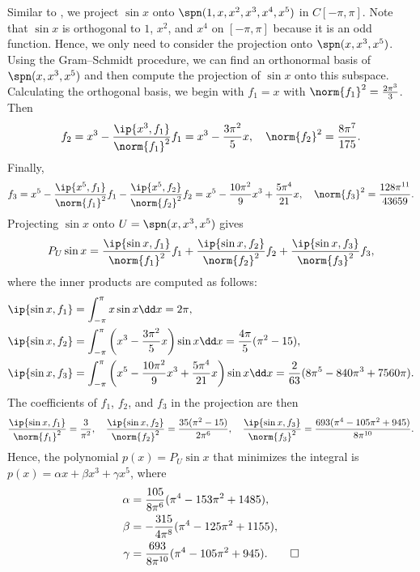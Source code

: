 \begin{sol}
    Similar to , we project $\sin x$ onto $\spn(1, x, x^2, x^3, x^4, x^5)$ in $C[-\pi, \pi]$.
    Note that $\sin x$ is orthogonal to $1$, $x^2$, and $x^4$ on $[-\pi, \pi]$ because it is an odd function.
    Hence, we only need to consider the projection onto $\spn(x, x^3, x^5)$.
    Using the Gram--Schmidt procedure, we can find an orthonormal basis of $\spn(x, x^3, x^5)$ and then compute the projection of $\sin x$ onto this subspace.
    Calculating the orthogonal basis, we begin with $f_1 = x$ with $\norm{f_1}^2 = \frac{2\pi^3}{3}$.
    Then
    \[
        f_2 = x^3 - \frac{\ip{x^3, f_1}}{\norm{f_1}^2} f_1 = x^3 - \frac{3\pi^2}{5}x, \quad \norm{f_2}^2 = \frac{8\pi^7}{175}.
    \]
    Finally,
    \[
        f_3 = x^5 - \frac{\ip{x^5, f_1}}{\norm{f_1}^2} f_1 - \frac{\ip{x^5, f_2}}{\norm{f_2}^2} f_2 = x^5 - \frac{10\pi^2}{9}x^3 + \frac{5\pi^4}{21}x, \quad \norm{f_3}^2 = \frac{128\pi^{11}}{43659}.
    \]
    Projecting $\sin x$ onto $U = \spn(x, x^3, x^5)$ gives
    \[
        P_U \sin x = \frac{\ip{\sin x, f_1}}{\norm{f_1}^2} f_1 + \frac{\ip{\sin x, f_2}}{\norm{f_2}^2} f_2 + \frac{\ip{\sin x, f_3}}{\norm{f_3}^2} f_3,
    \]
    where the inner products are computed as follows:
    \begin{align*}
        \ip{\sin x, f_1} &= \int_{-\pi}^{\pi} x \sin x \dd x = 2\pi, \\
        \ip{\sin x, f_2} &= \int_{-\pi}^{\pi} \left(x^3 - \frac{3\pi^2}{5}x\right) \sin x \dd x = \frac{4\pi}{5}(\pi^2 - 15), \\
        \ip{\sin x, f_3} &= \int_{-\pi}^{\pi} \left(x^5 - \frac{10\pi^2}{9}x^3 + \frac{5\pi^4}{21}x\right) \sin x \dd x = \frac{2}{63}(8\pi^5 - 840\pi^3 + 7560\pi).
    \end{align*}
    The coefficients of $f_1$, $f_2$, and $f_3$ in the projection are then
    \[
        \frac{\ip{\sin x, f_1}}{\norm{f_1}^2} = \frac{3}{\pi^2}, \quad
        \frac{\ip{\sin x, f_2}}{\norm{f_2}^2} = \frac{35(\pi^2 - 15)}{2\pi^6}, \quad
        \frac{\ip{\sin x, f_3}}{\norm{f_3}^2} = \frac{693(\pi^4 - 105\pi^2 + 945)}{8\pi^{10}}.
    \]
    Hence, the polynomial $p(x) = P_U \sin x$ that minimizes the integral is $p(x) = \alpha x + \beta x^3 + \gamma x^5$, where
    \begin{align*}
        \alpha &= \frac{105}{8\pi^6}(\pi^4-153\pi^2+1485), \\
        \beta &= -\frac{315}{4\pi^8}(\pi^4 - 125\pi^2 + 1155), \\
        \gamma &= \frac{693}{8\pi^{10}}(\pi^4 - 105\pi^2 + 945). \qedhere
    \end{align*}
\end{sol}

